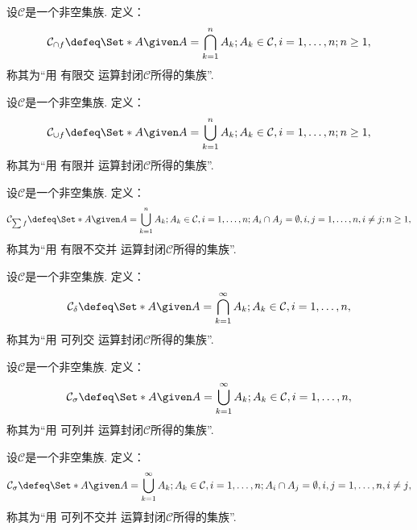 \begin{definition}
设\(\mathcal{C}\)是一个非空集族.
定义：\begin{equation*}
	\mathcal{C}_{\cap f}
	\defeq
	\Set*{
		A \given
		A = \bigcap_{k=1}^n A_k;
		A_k \in \mathcal{C}, i=1,\dotsc,n;
		n\geq1
	},
\end{equation*}
称其为“用 有限交 运算封闭\(\mathcal{C}\)所得的集族”.
\end{definition}
\begin{definition}
设\(\mathcal{C}\)是一个非空集族.
定义：\begin{equation*}
	\mathcal{C}_{\cup f}
	\defeq
	\Set*{
		A \given
		A = \bigcup_{k=1}^n A_k;
		A_k \in \mathcal{C}, i=1,\dotsc,n;
		n\geq1
	},
\end{equation*}
称其为“用 有限并 运算封闭\(\mathcal{C}\)所得的集族”.
\end{definition}
\begin{definition}
设\(\mathcal{C}\)是一个非空集族.
定义：\begin{equation*}
	\mathcal{C}_{\sum f}
	\defeq
	\Set*{
		A \given
		A = \bigcup_{k=1}^n A_k;
		A_k \in \mathcal{C}, i=1,\dotsc,n;
		A_i \cap A_j = \emptyset, i,j=1,\dotsc,n, i \neq j;
		n\geq1
	},
\end{equation*}
称其为“用 有限不交并 运算封闭\(\mathcal{C}\)所得的集族”.
\end{definition}
\begin{definition}
设\(\mathcal{C}\)是一个非空集族.
定义：\begin{equation*}
	\mathcal{C}_\delta
	\defeq
	\Set*{
		A \given
		A = \bigcap_{k=1}^\infty A_k;
		A_k \in \mathcal{C}, i=1,\dotsc,n
	},
\end{equation*}
称其为“用 可列交 运算封闭\(\mathcal{C}\)所得的集族”.
\end{definition}
\begin{definition}
设\(\mathcal{C}\)是一个非空集族.
定义：\begin{equation*}
	\mathcal{C}_\sigma
	\defeq
	\Set*{
		A \given
		A = \bigcup_{k=1}^\infty A_k;
		A_k \in \mathcal{C}, i=1,\dotsc,n
	},
\end{equation*}
称其为“用 可列并 运算封闭\(\mathcal{C}\)所得的集族”.
\end{definition}
\begin{definition}
设\(\mathcal{C}\)是一个非空集族.
定义：\begin{equation*}
	\mathcal{C}_\sigma
	\defeq
	\Set*{
		A \given
		A = \bigcup_{k=1}^\infty A_k;
		A_k \in \mathcal{C}, i=1,\dotsc,n;
		A_i \cap A_j = \emptyset, i,j=1,\dotsc,n, i \neq j
	},
\end{equation*}
称其为“用 可列不交并 运算封闭\(\mathcal{C}\)所得的集族”.
\end{definition}

